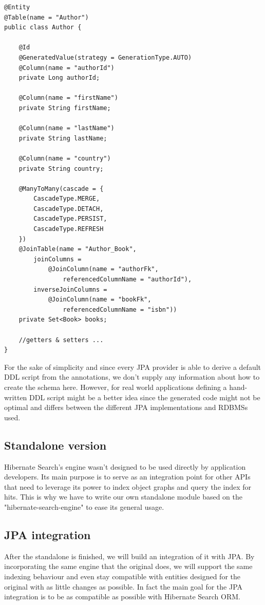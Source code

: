 \pagebreak

\lstset{language=java}
\begin{lstlisting}[frame=htrbl, caption={Author.java}, label={lst:author.java_1}]
@Entity
@Table(name = "Author")
public class Author {
	
	@Id
	@GeneratedValue(strategy = GenerationType.AUTO)
	@Column(name = "authorId")
	private Long authorId;
	
	@Column(name = "firstName")
	private String firstName;
	
	@Column(name = "lastName")
	private String lastName;
	
	@Column(name = "country")
	private String country;
	
	@ManyToMany(cascade = {
		CascadeType.MERGE, 
		CascadeType.DETACH, 
		CascadeType.PERSIST, 
		CascadeType.REFRESH
	})
	@JoinTable(name = "Author_Book", 
		joinColumns = 
			@JoinColumn(name = "authorFk", 
				referencedColumnName = "authorId"),
		inverseJoinColumns = 
			@JoinColumn(name = "bookFk", 
				referencedColumnName = "isbn"))
	private Set<Book> books;
	
	//getters & setters ...
}
\end{lstlisting}
For the sake of simplicity and since every JPA provider is able to derive a default DDL script from the annotations, we don't supply any information about how to create the schema here. However, for real world applications defining a hand-written DDL script might be a better idea since the generated code might not be optimal and differs between the different JPA implementations and RDBMSs used.

\pagebreak

\subsection{Standalone version} \label{problem_indexing_searching}
Hibernate Search's engine wasn't designed to be used directly by application developers. Its main purpose is to serve as an integration point for other APIs that need to leverage its power to index object graphs and query the index for hits. This is why we have to write our own standalone module based on the "hibernate-search-engine" to ease its general usage.

\subsection{JPA integration}
After the standalone is finished, we will build an integration of it with JPA. By incorporating the same engine that the original does, we will support the same indexing behaviour and even stay compatible with entities designed for the original with as little changes as possible. In fact the main goal for the JPA integration is to be as compatible as possible with Hibernate Search ORM.

